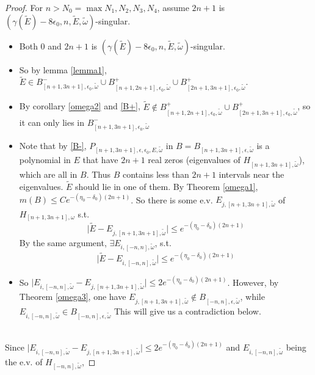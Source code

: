 \begin{proof}
For $n>N_0=\max{N_1,N_2,N_3,N_4}$, assume $2n+1$ is $(\gamma(\tilde{E})-8\epsilon_0,n,\tilde{E},\tilde{\omega})$-singular.
\begin{itemize}
  \item Both $0$ and $2n+1$ is $(\gamma(\tilde{E})-8\epsilon_0,n,\tilde{E},\tilde{\omega})$-singular.
  \item So by lemma \ref{lemma1},  $\tilde{E}\in B_{[n+1,3n+1],\epsilon_0,\tilde{\omega}}^-\cup B_{[n+1,2n+1],\epsilon_0,\tilde{\omega}}^+\cup B_{[2n+1,3n+1],\epsilon_0,\tilde{\omega}}^+$.
  \item By corollary \ref{omega2} and \eqref{B+}, $\tilde{E}\notin B_{[n+1,2n+1],\epsilon_0,\tilde{\omega}}^+\cup B_{[2n+1,3n+1],\epsilon_0,\tilde{\omega}}^+$, so it can only lies in $B_{[n+1,3n+1],\epsilon_0,\tilde{\omega}}^-$
  \item
   Note that by \eqref{B-}, $P_{[n+1,3n+1],\epsilon,\epsilon_0,E,\tilde{\omega}}$ in $B=B_{[n+1,3n+1],\epsilon,\tilde{\omega}}$ is a polynomial in $E$ that have $2n+1$ real zeros (eigenvalues of $H_{[n+1,3n+1],\tilde{\omega}}$), which are all in $B$. Thus $B$ contains less than $2n+1$ intervals near the eigenvalues. $\tilde{E}$ should lie in one of them. By Theorem \ref{omega1}, $m(B)\leq Ce^{-(\eta_0-\delta_0)(2n+1)}$. So there is some e.v. $E_{j,[n+1,3n+1],\tilde{\omega}}$ of $H_{[n+1,3n+1],\omega}$ s.t.
   \[
   \vert\tilde{E}-E_{j,[n+1,3n+1],\tilde{\omega}}\vert\leq e^{-(\eta_0-\delta_0)(2n+1)}
   \]
  By the same argument, $\exists E_{i,[-n,n],\tilde{\omega}}$, s.t.
   \[
   \vert\tilde{E}-E_{i,[-n,n],\tilde{\omega}}\vert\leq e^{-(\eta_0-\delta_0)(2n+1)}
   \]
   \item So $\vert E_{i,[-n,n],\tilde{\omega}}-E_{j,[n+1,3n+1],\tilde{\omega}}\vert\leq 2e^{-(\eta_0-\delta_0)(2n+1)}$. However, by Theorem \ref{omega3}, one have $E_{j,[n+1,3n+1],\tilde{\omega}}\notin B_{[-n,n],\epsilon,\tilde{\omega}}$, while $E_{i,[-n,n],\tilde{\omega}}\in B_{[-n,n],\epsilon,\tilde{\omega}}$
   This will give us a contradiction below.
\end{itemize}
~\\
Since $\vert E_{i,[-n,n],\tilde{\omega}}-E_{j,[n+1,3n+1],\tilde{\omega}}\vert\leq 2e^{-(\eta_0-\delta_0)(2n+1)}$ and $E_{i,[-n,n],\tilde{\omega}}$ being the e.v. of $H_{[-n,n],\tilde{\omega}}$,

\end{proof}
